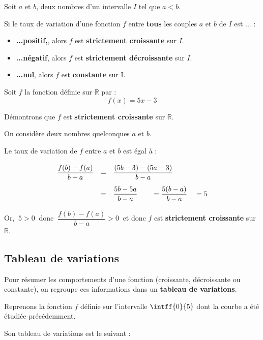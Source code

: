 \begin{prop}
	Soit $a$ et $b$, deux nombres d'un intervalle $I$ tel que $a < b$.

	Si le taux de variation d'une fonction $f$ entre \textbf{tous} les couples $a$ et $b$ de $I$ est ... :

	\begin{itemize}
		\item \textbf{...positif,}, alors $f$ est \textbf{strictement croissante} sur $I$.
		\item \textbf{...négatif}, alors $f$ est \textbf{strictement décroissante} sur $I$.
		\item \textbf{...nul}, alors $f$ est \textbf{constante} sur I.
	\end{itemize}
\end{prop}

\begin{methode}
	Soit $f$ la fonction définie sur $\mathbb{R}$ par :
	\[
		f(x)=5x-3
	\]

	Démontrons que $f$ est \textbf{strictement croissante} sur $\mathbb{R}$.

	On considère deux nombres quelconques $a$ et $b$.

	Le taux de variation de $f$ entre $a$ et $b$ est égal à :
	\[
		\def\arraystretch{2.5}
		\begin{array}{rcl}
			\dfrac{f(b)-f(a)}{b-a} & = & \dfrac{(5b-3)-(5a-3)}{b-a}                             \\
			                       & = & \dfrac{5b-5a}{b-a}\qquad = \dfrac{5(b-a)}{b-a}\quad =5
		\end{array}
	\]

	Or, $~5>0~$ donc $~\dfrac{f(b)-f(a)}{b-a}>0~$ et donc $f$ est \textbf{strictement croissante} sur $\mathbb{R}$.
\end{methode}

\subsection{Tableau de variations}
Pour résumer les comportements d'une fonction (croissante, décroissante ou constante), on regroupe ces informations dans un \textbf{tableau de variations}.

\begin{ex}
	Reprenons la fonction $f$ définie sur l'intervalle $\intff{0}{5}$ dont la courbe a été étudiée précédemment.

	Son tableau de variations est le suivant :
	\begin{center}
	\end{center}
\end{ex}

